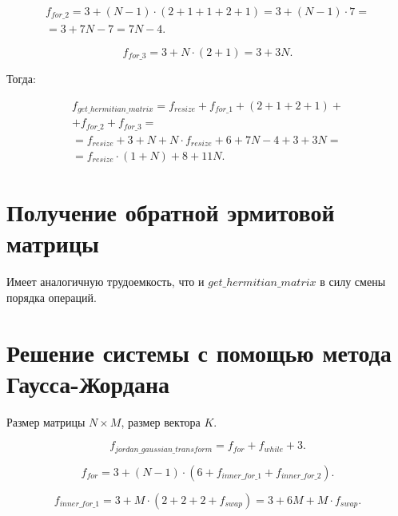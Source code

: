 \begin{equation}
	\begin{gathered}
		f_{for\_2} = 3 + (N - 1) \cdot (2 + 1 + 1 + 2 + 1) = 3 + (N - 1) \cdot 7 =\\=3 + 7N - 7 = 7N - 4.
	\end{gathered}
\end{equation}

\begin{equation}
	f_{for\_3} = 3 + N \cdot (2 + 1) = 3 + 3N.
\end{equation}

Тогда:

\begin{equation}
	\begin{gathered}
		f_{get\_hermitian\_matrix} = f_{resize} + f_{for\_1} + (2 + 1 + 2 + 1) +\\+ f_{for\_2} + f_{for\_3} =\\=f_{resize} + 3 + N + N \cdot f_{resize} + 6 + 7N - 4 + 3 + 3N =\\=
		f_{resize} \cdot (1 + N) + 8 + 11N.
	\end{gathered}
\end{equation}

\section{Получение обратной эрмитовой матрицы}

Имеет аналогичную трудоемкость, что и $get\_hermitian\_matrix$ в силу смены порядка операций.

\section{Решение системы с помощью метода Гаусса-Жордана}

Размер матрицы $N \times M$, размер вектора $K$.

\begin{equation}
	f_{jordan\_gaussian\_transform} = f_{for} + f_{while} + 3.
\end{equation}

\begin{equation}
	f_{for} = 3 + (N - 1) \cdot (6 + f_{inner\_for\_1} + f_{inner\_for\_2}).
\end{equation}

\begin{equation}
	f_{inner\_for\_1} = 3 + M \cdot (2 + 2 + 2 + f_{swap}) = 3 + 6M + M \cdot f_{swap}.
\end{equation}

